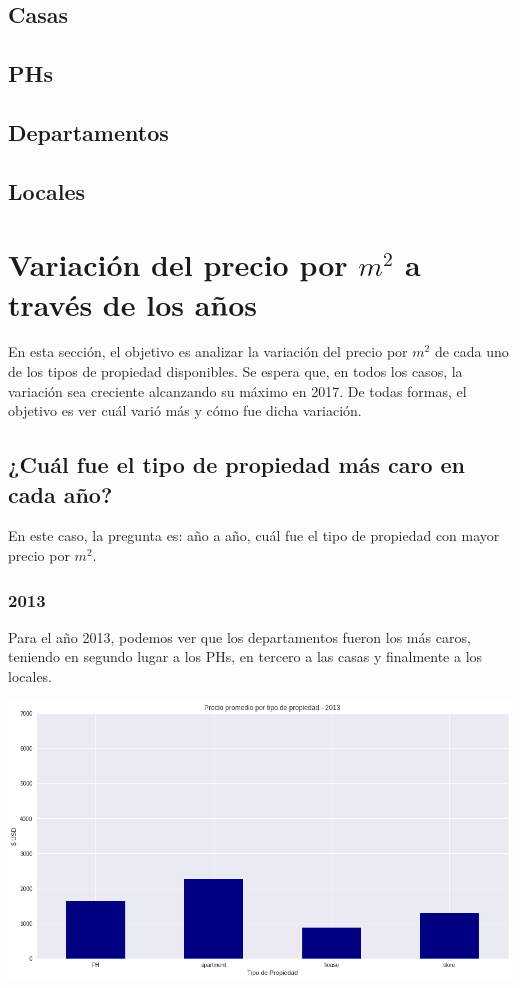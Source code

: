 \documentclass[a4paper, 10pt]{article}
\begin{document}
			\subsection{Casas}
			\subsection{PHs}
			\subsection{Departamentos}
			\subsection{Locales}
		\section{Variación del precio por $m^2$ a través de los años}
			En esta sección, el objetivo es analizar la variación del precio por $m^2$ de cada uno de los tipos de propiedad
			disponibles. Se espera que, en todos los casos, la variación sea creciente alcanzando su máximo en 2017. De todas formas,
			el objetivo es ver cuál varió más y cómo fue dicha variación.
			\subsection{¿Cuál fue el tipo de propiedad más caro en cada año?}
				En este caso, la pregunta es: año a año, cuál fue el tipo de propiedad con mayor precio por $m^2$.
				\subsubsection{2013}
					Para el año 2013, podemos ver que los departamentos fueron los más caros, teniendo en segundo lugar a los
					PHs, en tercero a las casas y finalmente a los locales.
					\begin{center}
   		    				\includegraphics[width=\textwidth]{images/propPrice2013}
				  	\end{center}
\end{document}
